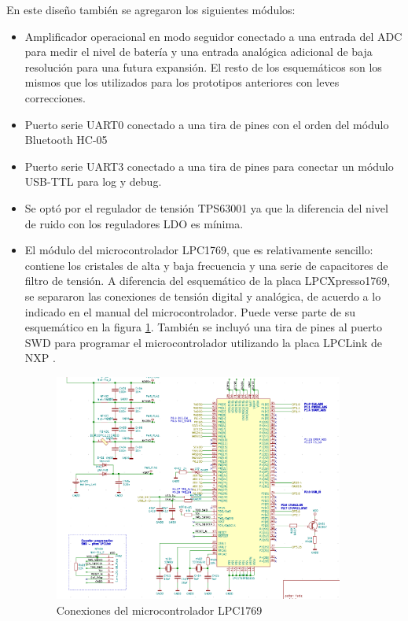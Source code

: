 En este diseño también se agregaron los siguientes módulos:

\begin{itemize}

\item Amplificador operacional en modo seguidor conectado a una entrada del ADC para medir el nivel de batería y una entrada analógica adicional de baja resolución para una futura expansión. El resto de los esquemáticos son los mismos que los utilizados para los prototipos anteriores con leves correcciones.

\item Puerto serie UART0 conectado a una tira de pines con el orden del módulo Bluetooth HC-05

\item Puerto serie UART3 conectado a una tira de pines para conectar un módulo USB-TTL para log y debug.

\item Se optó por el regulador de tensión TPS63001 ya que la diferencia del nivel de ruido con los reguladores LDO es mínima.

\item El módulo del microcontrolador LPC1769, que es relativamente sencillo: contiene los cristales de alta y baja frecuencia y una serie de capacitores de filtro de tensión. A diferencia del esquemático de la placa LPCXpresso1769, se separaron las conexiones de tensión digital y analógica, de acuerdo a lo indicado en el manual del microcontrolador. Puede verse parte de su esquemático en la figura \ref{fig:esqlpc1769}. También 
se incluyó una tira de pines al puerto SWD para programar el microcontrolador utilizando la placa LPCLink de NXP \citep{nxp2013}.


\begin{figure}[!htbp]
	\centering	
	\includegraphics[width=0.9\textwidth]{./Figures/esqlpc1769.png}			
	\caption{Conexiones del microcontrolador LPC1769}
	\label{fig:esqlpc1769}
\end{figure}

\end{itemize}

